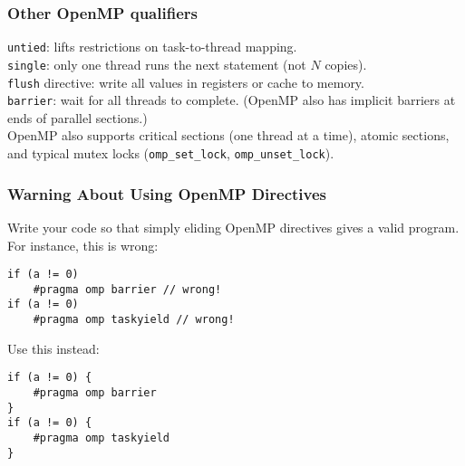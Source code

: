 \begin{frame}[fragile]
  \frametitle{Other OpenMP qualifiers}

  
    {\tt untied}: lifts restrictions on task-to-thread mapping.\\[1em]

    {\tt single}: only one thread runs the next statement (not $N$ copies).\\[1em]

    {\tt flush} directive: write all values in registers or cache to memory.\\[1em]

    {\tt barrier}: wait for all threads to complete. (OpenMP also has implicit
barriers at ends of parallel sections.)\\[1em]

    OpenMP also supports critical sections (one thread at a time), atomic
 sections, and typical mutex locks (\verb+omp_set_lock+,
 \verb+omp_unset_lock+).
  

\end{frame}

\begin{frame}[fragile]
  \frametitle{Warning About Using OpenMP Directives}

  

  Write your code so that simply eliding OpenMP directives gives a valid program.\\[1em]

  For instance, this is wrong:
  \begin{lstlisting}
if (a != 0)
    #pragma omp barrier // wrong!
if (a != 0)
    #pragma omp taskyield // wrong!
  \end{lstlisting}

  Use this instead:
  \begin{lstlisting}
if (a != 0) {
    #pragma omp barrier
}
if (a != 0) {
    #pragma omp taskyield
}
  \end{lstlisting}
  

\end{frame}




